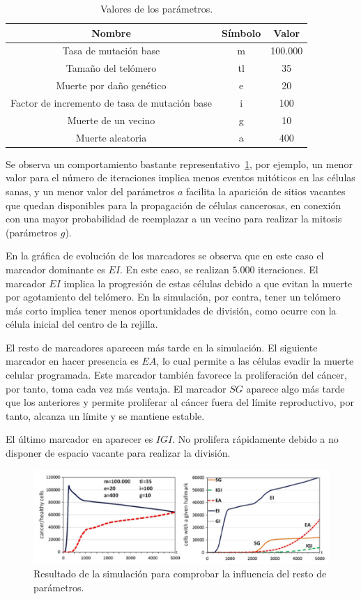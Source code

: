 \begin{table}[h!]
  \centering
  \caption{Valores de los parámetros.}
  \label{tab:table1}
  \begin{tabular}{ccc}
    \toprule
    Nombre & Símbolo & Valor\\
    \midrule
    Tasa de mutación base & m & 100.000\\
    Tamaño del telómero & tl & 35\\
    Muerte por daño genético & e & 20\\
    Factor de incremento de tasa de mutación base & i & 100\\
    Muerte de un vecino & g & 10\\
    Muerte aleatoria & a & 400\\
    \bottomrule
  \end{tabular}
\end{table}

Se observa un comportamiento bastante representativo~\ref{fig:exp4}, por ejemplo, un menor valor
para el número de iteraciones implica menos eventos mitóticos en las células sanas, y
un menor valor del parámetros $a$ facilita la aparición de sitios vacantes que
quedan disponibles para la propagación de células cancerosas, en conexión con una
mayor probabilidad de reemplazar a un vecino para realizar la mitosis (parámetros $g$).

En la gráfica de evolución de los marcadores se observa que en este caso el marcador
dominante es $EI$. En este caso, se realizan $5.000$ iteraciones. El marcador $EI$ implica
la progresión de estas células debido a que evitan la muerte por agotamiento del telómero.
En la simulación, por contra, tener un telómero más corto implica tener menos oportunidades de división, como
ocurre con la célula inicial del centro de la rejilla.

El resto de marcadores aparecen más tarde en la simulación. El siguiente marcador en hacer
presencia es $EA$, lo cual permite a las células evadir la muerte celular programada. Este marcador
también favorece la proliferación del cáncer, por tanto, toma cada vez más ventaja. El marcador
$SG$ aparece algo más tarde que los anteriores y permite proliferar al cáncer
fuera del límite reproductivo, por tanto, alcanza un límite y se mantiene estable.

El último marcador en aparecer es $IGI$. No prolifera rápidamente debido a no disponer
de espacio vacante para realizar la división.

\begin{figure}[h]
\centering
\includegraphics[scale=0.8]{figures/experiments/exp4}
\caption{Resultado de la simulación para comprobar la influencia del resto de parámetros.}
\label{fig:exp4}
\end{figure}

